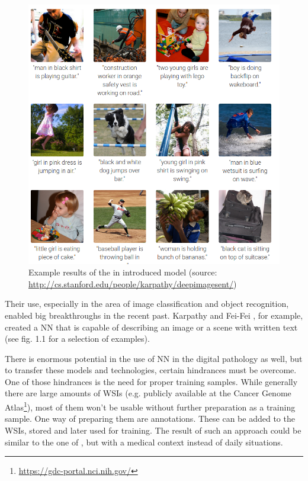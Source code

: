 \begin{figure}[ht]
	\begin{center}
		\includegraphics[scale=0.3]{img/deepVisual.png}
		\caption{Example results of the in \cite{Karpathy15} introduced model (source: \url{http://cs.stanford.edu/people/karpathy/deepimagesent/})}
		\label{fig:fig1.1}
	\end{center}
\end{figure}

Their use, especially in the area of image classification and object recognition, enabled big breakthroughs in the recent past. Karpathy and Fei-Fei \cite{Karpathy15}, for example, created a NN that is capable of describing an image or a scene with written text (see fig. 1.1 for a selection of examples).

There is enormous potential in the use of NN in the digital pathology as well, but to transfer these models and technologies, certain hindrances must be overcome. One of those hindrances is the need for proper training samples. While generally there are large amounts of WSIs (e.g. publicly available at the Cancer Genome Atlas\footnote{\url{https://gdc-portal.nci.nih.gov/}}), most of them won't be usable without further preparation as a training sample. One way of preparing them are annotations. These can be added to the WSIs, stored and later used for training. The result of such an approach could be similar to the one of \cite{Karpathy15}, but with a medical context instead of daily situations.

